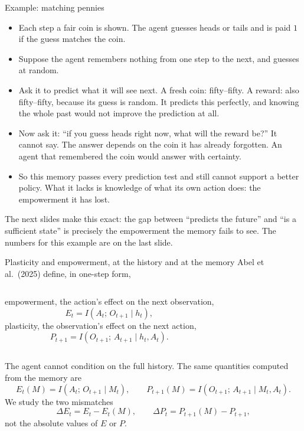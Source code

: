 \documentclass[11pt,aspectratio=169]{beamer}
\newcommand{\dE}{\Delta E}
\newcommand{\dP}{\Delta P}
\begin{document}
\begin{frame}[shrink=8]{Example: matching pennies}
\begin{itemize}\setlength{\itemsep}{6pt}
\item Each step a fair coin is shown. The agent guesses heads or tails and is paid $1$ if the guess matches the coin.
\item Suppose the agent remembers nothing from one step to the next, and guesses at random.
\item Ask it to predict what it will see next. A fresh coin: fifty--fifty. A reward: also fifty--fifty, because its guess is random. It predicts this perfectly, and knowing the whole past would not improve the prediction at all.
\item Now ask it: ``if you guess heads right now, what will the reward be?'' It cannot say. The answer depends on the coin it has already forgotten. An agent that remembered the coin would answer with certainty.
\item So this memory passes every prediction test and still cannot support a better policy. What it lacks is knowledge of what its own action does: the empowerment it has lost.
\end{itemize}
\vspace{3mm}
The next slides make this exact: the gap between ``predicts the future'' and ``is a sufficient state'' is precisely the empowerment the memory fails to see. The numbers for this example are on the last slide.
\end{frame}

\begin{frame}{Plasticity and empowerment, at the history and at the memory}
Abel et al.\ (2025) define, in one-step form,
\begin{columns}[T]
empowerment, the action's effect on the next observation,
\[
E_t = I(A_t;\, O_{t+1} \mid h_t),
\]
plasticity, the observation's effect on the next action,
\[
P_{t+1} = I(O_{t+1};\, A_{t+1} \mid h_t, A_t).
\]
\end{columns}
\vspace{3mm}
The agent cannot condition on the full history. The same quantities computed from the memory are
\[
E_t(M) = I(A_t;\, O_{t+1} \mid M_t), \qquad P_{t+1}(M) = I(O_{t+1};\, A_{t+1} \mid M_t, A_t).
\]
\vspace{1mm}
We study the two mismatches
\[
\dE_t = E_t - E_t(M), \qquad \dP_t = P_{t+1}(M) - P_{t+1},
\]
not the absolute values of $E$ or $P$.
\end{frame}
\end{document}
